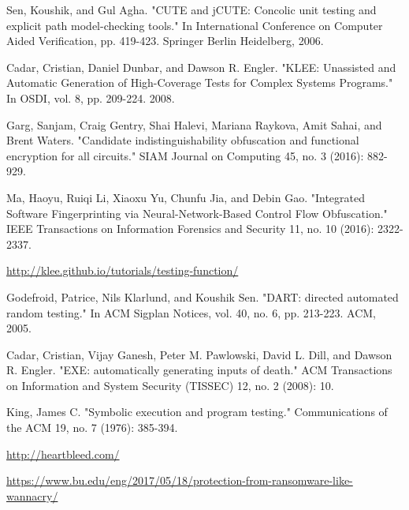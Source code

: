 \documentclass[ms,12pt]{psuthesis}
\begin{document}
\begin{singlespace}
\begin{thebibliography}{99}


 Sen, Koushik, and Gul Agha. "CUTE and jCUTE: Concolic unit testing and explicit path model-checking tools." In International Conference on Computer Aided Verification, pp. 419-423. Springer Berlin Heidelberg, 2006.

 Cadar, Cristian, Daniel Dunbar, and Dawson R. Engler. "KLEE: Unassisted and Automatic Generation of High-Coverage Tests for Complex Systems Programs." In OSDI, vol. 8, pp. 209-224. 2008.

 Garg, Sanjam, Craig Gentry, Shai Halevi, Mariana Raykova, Amit Sahai, and Brent Waters. "Candidate indistinguishability obfuscation and functional encryption for all circuits." SIAM Journal on Computing 45, no. 3 (2016): 882-929.

 Ma, Haoyu, Ruiqi Li, Xiaoxu Yu, Chunfu Jia, and Debin Gao. "Integrated Software Fingerprinting via Neural-Network-Based Control Flow Obfuscation." IEEE Transactions on Information Forensics and Security 11, no. 10 (2016): 2322-2337.

 \url{http://klee.github.io/tutorials/testing-function/}

 Godefroid, Patrice, Nils Klarlund, and Koushik Sen. "DART: directed automated random testing." In ACM Sigplan Notices, vol. 40, no. 6, pp. 213-223. ACM, 2005.

 Cadar, Cristian, Vijay Ganesh, Peter M. Pawlowski, David L. Dill, and Dawson R. Engler. "EXE: automatically generating inputs of death." ACM Transactions on Information and System Security (TISSEC) 12, no. 2 (2008): 10.

 King, James C. "Symbolic execution and program testing." Communications of the ACM 19, no. 7 (1976): 385-394.

 \url{http://heartbleed.com/}

 \url{https://www.bu.edu/eng/2017/05/18/protection-from-ransomware-like-wannacry/}


\end{thebibliography}
\end{singlespace}

\backmatter

\end{document}
